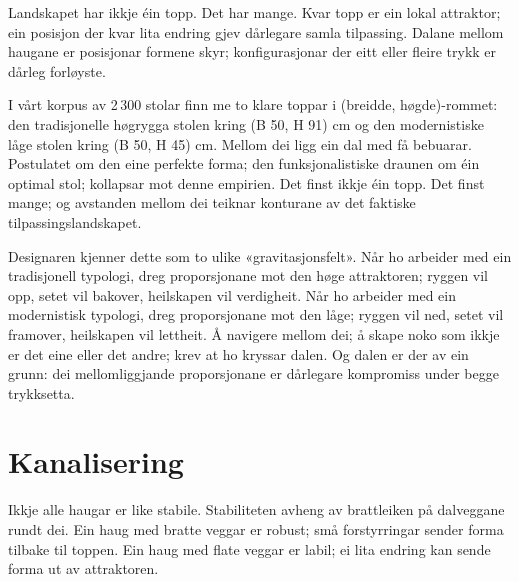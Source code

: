 
Landskapet har ikkje éin topp. Det har mange. Kvar topp er ein lokal attraktor; ein posisjon der kvar lita endring gjev dårlegare samla tilpassing. Dalane mellom haugane er posisjonar formene skyr; konfigurasjonar der eitt eller fleire trykk er dårleg forløyste.

I vårt korpus av 2\,300 stolar finn me to klare toppar i (breidde, høgde)-rommet: den tradisjonelle høgrygga stolen kring (B  50, H  91) cm og den modernistiske låge stolen kring (B  50, H  45) cm. Mellom dei ligg ein dal med få bebuarar. Postulatet om den eine perfekte forma; den funksjonalistiske draunen om éin optimal stol; kollapsar mot denne empirien. Det finst ikkje éin topp. Det finst mange; og avstanden mellom dei teiknar konturane av det faktiske tilpassingslandskapet.

Designaren kjenner dette som to ulike «gravitasjonsfelt». Når ho arbeider med ein tradisjonell typologi, dreg proporsjonane mot den høge attraktoren; ryggen vil opp, setet vil bakover, heilskapen vil verdigheit. Når ho arbeider med ein modernistisk typologi, dreg proporsjonane mot den låge; ryggen vil ned, setet vil framover, heilskapen vil lettheit. Å navigere mellom dei; å skape noko som ikkje er det eine eller det andre; krev at ho kryssar dalen. Og dalen er der av ein grunn: dei mellomliggjande proporsjonane er dårlegare kompromiss under begge trykksetta.

\section*{Kanalisering}


Ikkje alle haugar er like stabile. Stabiliteten avheng av brattleiken på dalveggane rundt dei. Ein haug med bratte veggar er robust; små forstyrringar sender forma tilbake til toppen. Ein haug med flate veggar er labil; ei lita endring kan sende forma ut av attraktoren.

